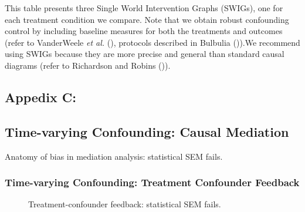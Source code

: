 \documentclass[
  single column]{article}
\begin{document}
\begin{table}

\caption{\label{tbl-swig}This table presents three Single World
Intervention Graphs (SWIGs), one for each treatment condition we
compare. Note that we obtain robust confounding control by including
baseline measures for both the treatments and outcomes (refer to
VanderWeele \emph{et al.} (),
protocols described in Bulbulia
()).We recommend using SWIGs
because they are more precise and general than standard causal diagrams
(refer to Richardson and Robins
()).}

\centering{

\lmtptablethree

}

\end{table}%

\subsection{Appedix C:}\label{appedix-c}

\subsection{Time-varying Confounding: Causal
Mediation}\label{time-varying-confounding-causal-mediation}

\begin{table}

\caption{\label{tbl-mediation}Anatomy of bias in mediation analysis:
statistical SEM fails.}

\centering{

\mediationfull

}

\end{table}%

\newpage{}

\subsubsection{Time-varying Confounding: Treatment Confounder
Feedback}\label{time-varying-confounding-treatment-confounder-feedback}

\begin{figure}

\centering{

\feedbackA

}

\caption{\label{fig-timevarying-amplification}Treatment-confounder
feedback: statistical SEM fails.}

\end{figure}%
\end{document}
